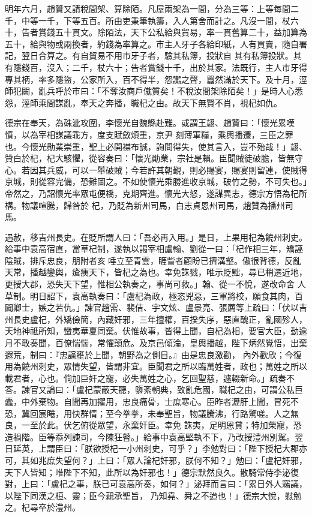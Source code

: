 \begin{pinyinscope}
 明年六月，趙贊又請稅間架、算除陌。凡屋兩架為一間，分為三等：上等每間二千，中等一千，下等五百。所由吏秉筆執籌，入人第舍而計之。凡沒一間，杖六十，告者賞錢五十貫文。除陌法，天下公私給與貿易，率一貫舊算二十，益加算為五十，給與物或兩換者，約錢為率算之。市主人牙子各給印紙，人有買賣，隨自署記，翌日合算之。有自貿易不用市牙子者，驗其私簿，投狀自
 其有私簿投狀。其有隱錢百，沒入；二千，杖六十；告者賞錢十千，出於其家。法既行，主人市牙得專其柄，率多隱盜，公家所入，百不得半，怨讟之聲，囂然滿於天下。及十月，涇師犯闕，亂兵呼於市曰：「不奪汝商戶僦質矣！不稅汝間架除陌矣！」是時人心悉怨，涇師乘間謀亂，奉天之奔播，職杞之由。故天下無賢不肖，視杞如仇。



 德宗在奉天，為硃泚攻圍，李懷光自魏縣赴難。或謂王翃、趙贊曰：「懷光累嘆憤，以為宰相謀議乖方，度支賦斂煩重，京尹
 刻薄軍糧，乘輿播遷，三臣之罪也。今懷光勛業崇重，聖上必開襟布誠，詢問得失，使其言入，豈不殆哉！」翃、贊白於杞，杞大駭懼，從容奏曰：「懷光勛業，宗社是賴。臣聞賊徒破膽，皆無守心。若因其兵威，可以一舉破賊；今若許其朝覲，則必賜宴，賜宴則留連，使賊得京城，則從容完備，恐難圖之。不如使懷光乘勝進收京城，破竹之勢，不可失也。」帝然之，乃詔懷光率眾屯便橋，克期齊進。懷光大怒，遂謀異志，德宗方悟為杞所構。物議喧騰，歸咎於
 杞，乃貶為新州司馬，白志貞恩州司馬，趙贊為播州司馬。



 遇赦，移吉州長史。在貶所謂人曰：「吾必再入用。」是日，上果用杞為饒州刺史。給事中袁高宿直，當草杞制，遂執以謁宰相盧翰、劉從一曰：「杞作相三年，矯誣陰賊，排斥忠良，朋附者亥唾立至青雲，睚眥者顧盼已擠溝壑。傲很背德，反亂天常，播越鑾輿，瘡痍天下，皆杞之為也。幸免誅戮，唯示貶黜，尋已稍遷近地，更授大郡，恐失天下望，惟相公執奏之，事尚可救。」翰、從一不悅，遂改命舍
 人草制。明日詔下，袁高執奏曰：「盧杞為政，極恣兇惡，三軍將校，願食其肉，百闢卿士，嫉之若仇。」諫官趙需、裴佶、宇文炫、盧景亮、張薦等上疏曰：「伏以吉州長史盧杞，外矯儉簡，內藏奸邪，三年擅權，百揆失序，惡直醜正，亂國殄人，天地神祗所知，蠻夷華夏同棄。伏惟故事，皆得上聞，自杞為相，要官大臣，動逾月不敢奏聞，百僚惴惴，常懼顛危。及京邑傾淪，皇輿播越，陛下炳然覺悟，出棄遐荒，制曰：『忠讜壅於上聞，朝野為之側目。』由是忠良激勸，
 內外歡欣；今復用為饒州刺史，眾情失望，皆謂非宜。臣聞君之所以臨萬姓者，政也；萬姓之所以載君者，心也。倘加巨奸之寵，必失萬姓之心，乞回聖慈，遽輟新命。」疏奏不答。諫官又論曰：「盧杞蒙蔽天聽，隳紊朝典，致亂危國，職杞之由，可謂公私巨蠹，中外棄物。自聞再加擢用，忠良痛骨，士庶寒心。臣昨者瀝肝上聞，冒死不恐，冀回宸睠，用快群情；至今拳拳，未奉聖旨，物議騰沸，行路驚嗟。人之無良，一至於此。伏乞俯從眾望，永棄奸臣。幸免
 誅夷，足明恩貸；特加榮寵，恐造禍階。臣等忝列諫司，今陳狂瞽。」給事中袁高堅執不下，乃改授澧州別駕。翌日延英，上謂臣曰：「朕欲授杞一小州刺史，可乎？」李勉對曰：「陛下授杞大郡亦可，其如兆庶失望何？」上曰：「眾人論杞奸邪，朕何不知？」勉曰：「盧杞奸邪，天下人皆知；唯陛下不知，此所以為奸邪也！」德宗默然良久。散騎常侍李泌復對，上曰：「盧杞之事，朕已可袁高所奏，如何？」泌拜而言曰：「累日外人竊議，以陛下同漢之桓、靈；臣今親承聖旨，
 乃知堯、舜之不迨也！」德宗大悅，慰勉之。杞尋卒於澧州。




\end{pinyinscope}
